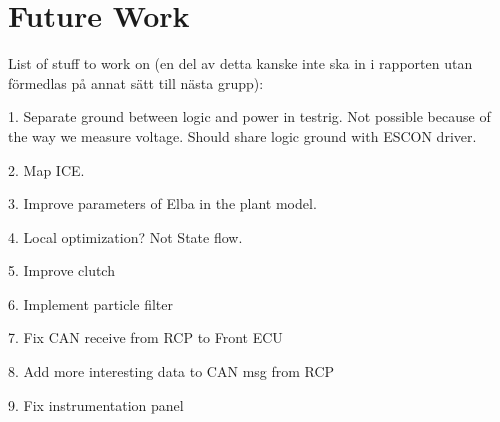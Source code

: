 \chapter{Future Work}

List of stuff to work on (en del av detta kanske inte ska in i rapporten utan förmedlas på annat sätt till nästa grupp):

1. Separate ground between logic and power in testrig. Not possible because of the way we measure voltage. Should share logic ground with ESCON driver.

2. Map ICE\@.

3. Improve parameters of Elba in the plant model.

4. Local optimization? Not State flow.

5. Improve clutch

6. Implement particle filter

7. Fix CAN receive from RCP to Front ECU

8. Add more interesting data to CAN msg from RCP

9. Fix instrumentation panel
